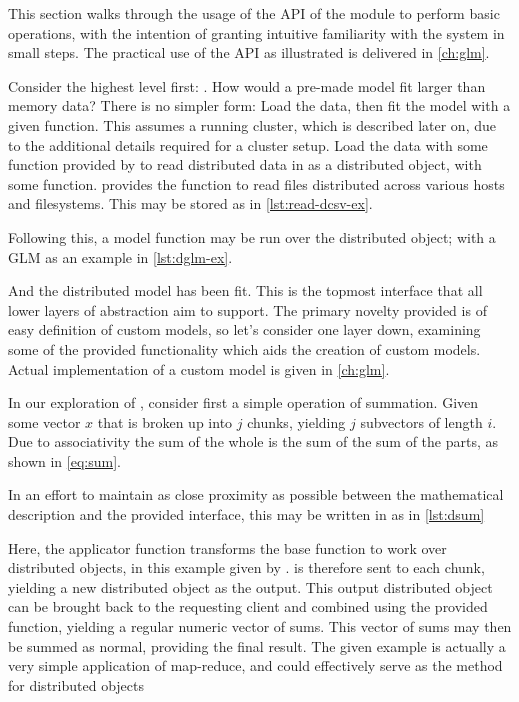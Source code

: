 This section walks through the usage of the API of the \lso{} module to perform basic operations, with the intention of granting intuitive familiarity with the system in small steps.
The practical use of the API as illustrated is delivered in \cref{ch:glm}.

Consider the highest level first: \lsm{}.
How would a pre-made model fit larger than memory data?
There is no simpler form: Load the data, then fit the model with a given function.
This assumes a running cluster, which is described later on, due to the additional details required for a cluster setup.
Load the data with some function provided by \lso{} to read distributed data in as a distributed object, with some  function.
\lso{} provides the  function to read  files distributed across various hosts and filesystems.
This may be stored as in \cref{lst:read-dcsv-ex}.


Following this, a model function may be run over the distributed object; with a GLM as an example in \cref{lst:dglm-ex}.


And the distributed model has been fit.
This is the topmost interface that all lower layers of abstraction aim to support.
The primary novelty provided is of easy definition of custom models, so let's consider one layer down, examining some of the provided functionality which aids the creation of custom models.
Actual implementation of a custom model is given in \cref{ch:glm}.

In our exploration of \lso{}, consider first a simple operation of summation.
Given some vector $x$ that is broken up into $j$ chunks, yielding $j$ subvectors of length $i$.
Due to associativity the sum of the whole is the sum of the sum of the parts, as shown in \cref{eq:sum}.


In an effort to maintain as close proximity as possible between the mathematical description and the provided interface, this may be written in \lso{} as in \cref{lst:dsum}


Here, the  applicator function transforms the base  function to work over distributed objects, in this example given by .
 is therefore sent to each chunk, yielding a new distributed object as the output.
This output distributed object can be brought back to the requesting client and combined using the provided  function, yielding a regular \R{} numeric vector of sums.
This vector of sums may then be summed as normal, providing the final result.
The given example is actually a very simple application of map-reduce, and could effectively serve as the  method for distributed objects

